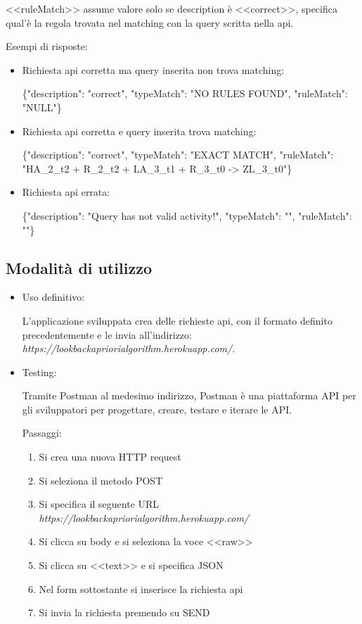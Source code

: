 \documentclass[a4paper]{article}
\begin{document}
<<ruleMatch>> assume valore solo se description è <<correct>>, specifica qual'è la regola trovata nel matching con la query scritta nella api.


Esempi di risposte:
\begin{itemize}
\item Richiesta api corretta ma query inserita non trova matching:

\{"description": "correct", "typeMatch": "NO RULES FOUND", "ruleMatch": "NULL"\} 

\item Richiesta api corretta e query inserita  trova matching:

\{"description": "correct", "typeMatch": "EXACT MATCH", "ruleMatch": "HA\_2\_t2 + R\_2\_t2 + LA\_3\_t1 + R\_3\_t0 -> ZL\_3\_t0"\}

\item Richiesta api errata:

\{"description": "Query has not valid activity!", "typeMatch": "", "ruleMatch": ""\}

\end{itemize}

\subsection{Modalità di utilizzo}

\begin{itemize}
\item Uso definitivo:

L'applicazione sviluppata crea delle richieste api, con il formato definito precedentemente e le invia all'indirizzo: \emph{https://lookbackapriorialgorithm.herokuapp.com/}.

\item Testing:

 Tramite Postman al medesimo indirizzo, Postman è una piattaforma API per gli sviluppatori per progettare, creare, testare e iterare le API.

Passaggi:
\begin{enumerate}
\item Si crea una nuova HTTP request
\item Si seleziona il metodo POST
\item Si specifica il seguente URL \emph{https://lookbackapriorialgorithm.herokuapp.com/}
\item Si clicca su body e si seleziona la voce <<raw>>
\item Si clicca su <<text>> e si specifica JSON
\item Nel form sottostante si inserisce la richiesta api
\item Si invia la richiesta premendo su SEND

\end{enumerate}

\end{itemize}
\end{document}
